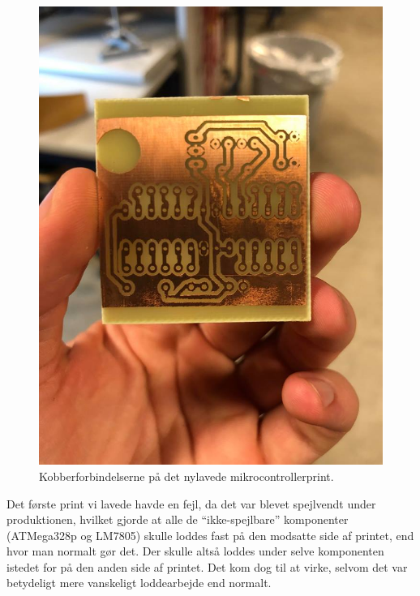 \begin{figure}[H]
\centering
\includegraphics[scale=0.4]{Billeder/print.jpg}
\caption{ Kobberforbindelserne på det nylavede mikrocontrollerprint.}
\label{fig:print_test}
\end{figure}

Det første print vi lavede havde en fejl, da det var blevet spejlvendt under produktionen, hvilket gjorde at alle de “ikke-spejlbare” komponenter (ATMega328p og LM7805) skulle loddes fast på den modsatte side af printet, end hvor man normalt gør det. Der skulle altså loddes under selve komponenten istedet for på den anden side af printet. Det kom dog til at virke, selvom det var betydeligt mere vanskeligt loddearbejde end normalt.


